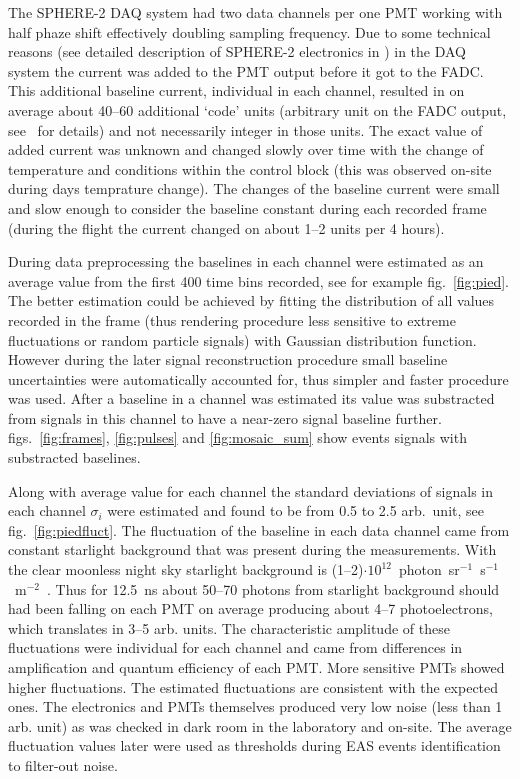 \documentclass[final,5p,times,twocolumn]{elsarticle}
\begin{document}
The \mbox{SPHERE-2} DAQ system had two data channels per one PMT working with half phaze shift effectively doubling sampling frequency. Due to some technical reasons (see detailed description of \mbox{SPHERE-2} electronics in \cite{Ant15a}) in the DAQ system the current was added to the PMT output before it got to the FADC. This additional baseline current, individual in each channel, resulted in on average about 40--60 additional `code' units (arbitrary unit on the FADC output, see~\cite{Ant16} for details) and not necessarily integer in those units. The exact value of added current was unknown and changed slowly over time with the change of temperature and conditions within the control block (this was observed on-site during days temprature change). The changes of the baseline current were small and slow enough to consider the baseline constant during each recorded frame (during the flight the current changed on about 1--2 units per 4 hours). 

During data preprocessing the baselines in each channel were estimated as an average value from the first 400 time bins recorded, see for example fig.~\ref{fig:pied}. The better estimation could be achieved by fitting the distribution of all values recorded in the frame (thus rendering procedure less sensitive to extreme fluctuations or random particle signals) with Gaussian distribution function. However during the later signal reconstruction procedure small baseline uncertainties were automatically accounted for, thus simpler and faster procedure was used. After a baseline in a channel was estimated its value was substracted from signals in this channel to have a near-zero signal baseline further. figs.~\ref{fig:frames}, \ref{fig:pulses} and \ref{fig:mosaic_sum} show events signals with substracted baselines.

Along with average value for each channel the standard deviations of signals in each channel $\sigma_i$ were estimated and found to be from 0.5 to 2.5 arb.~unit, see  fig.~\ref{fig:piedfluct}. The fluctuation of the baseline in each data channel came from constant starlight background that was present during the measurements. With the clear moonless night sky starlight background is (1--2)$\cdot10^{12}$~photon~sr$^{-1}$~s$^{-1}$~m$^{-2}$~\cite{starlightbackground}. Thus for 12.5~ns about 50--70 photons from starlight background should had been falling on each PMT on average producing about 4--7 photoelectrons, which translates in 3--5 arb. units. The characteristic amplitude of these fluctuations were individual for each channel and came from differences in amplification and quantum efficiency of each PMT. More sensitive PMTs showed higher fluctuations. The estimated fluctuations are consistent with the expected ones. The electronics and PMTs themselves produced very low noise (less than 1 arb. unit) as was checked in dark room in the laboratory and on-site. The average fluctuation values later were used as thresholds during EAS events identification to filter-out noise. 
\end{document}
